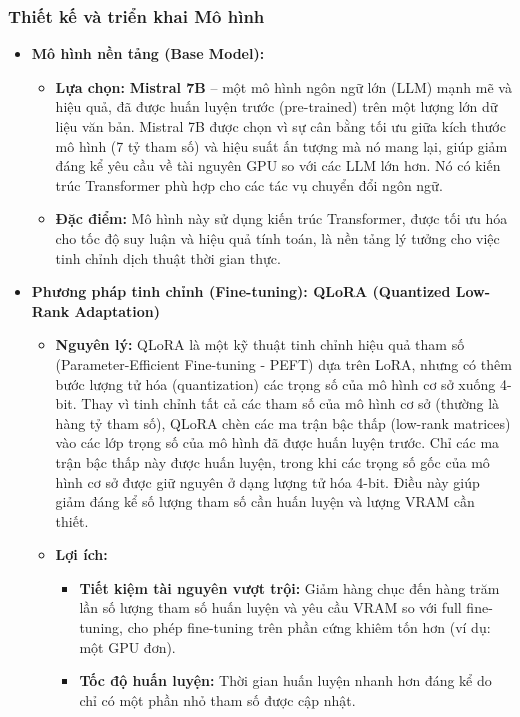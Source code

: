 \subsubsection{Thiết kế và triển khai Mô hình}
\begin{itemize}
    \item \textbf{Mô hình nền tảng (Base Model):}
    \begin{itemize}
        \item \textbf{Lựa chọn:} \textbf{Mistral 7B} -- một mô hình ngôn ngữ lớn (LLM) mạnh mẽ và hiệu quả, đã được huấn luyện trước (pre-trained) trên một lượng lớn dữ liệu văn bản. Mistral 7B được chọn vì sự cân bằng tối ưu giữa kích thước mô hình (7 tỷ tham số) và hiệu suất ấn tượng mà nó mang lại, giúp giảm đáng kể yêu cầu về tài nguyên GPU so với các LLM lớn hơn. Nó có kiến trúc Transformer phù hợp cho các tác vụ chuyển đổi ngôn ngữ.
        \item \textbf{Đặc điểm:} Mô hình này sử dụng kiến trúc Transformer, được tối ưu hóa cho tốc độ suy luận và hiệu quả tính toán, là nền tảng lý tưởng cho việc tinh chỉnh dịch thuật thời gian thực.
    \end{itemize}
    \item \textbf{Phương pháp tinh chỉnh (Fine-tuning): QLoRA (Quantized Low-Rank Adaptation)}
    \begin{itemize}
        \item \textbf{Nguyên lý:} QLoRA là một kỹ thuật tinh chỉnh hiệu quả tham số (Parameter-Efficient Fine-tuning - PEFT) dựa trên LoRA, nhưng có thêm bước lượng tử hóa (quantization) các trọng số của mô hình cơ sở xuống 4-bit. Thay vì tinh chỉnh tất cả các tham số của mô hình cơ sở (thường là hàng tỷ tham số), QLoRA chèn các ma trận bậc thấp (low-rank matrices) vào các lớp trọng số của mô hình đã được huấn luyện trước. Chỉ các ma trận bậc thấp này được huấn luyện, trong khi các trọng số gốc của mô hình cơ sở được giữ nguyên ở dạng lượng tử hóa 4-bit. Điều này giúp giảm đáng kể số lượng tham số cần huấn luyện và lượng VRAM cần thiết.
        \item \textbf{Lợi ích:}
        \begin{itemize}
            \item \textbf{Tiết kiệm tài nguyên vượt trội:} Giảm hàng chục đến hàng trăm lần số lượng tham số huấn luyện và yêu cầu VRAM so với full fine-tuning, cho phép fine-tuning trên phần cứng khiêm tốn hơn (ví dụ: một GPU đơn).
            \item \textbf{Tốc độ huấn luyện:} Thời gian huấn luyện nhanh hơn đáng kể do chỉ có một phần nhỏ tham số được cập nhật.

\end{itemize}
\end{itemize}
\end{itemize}
